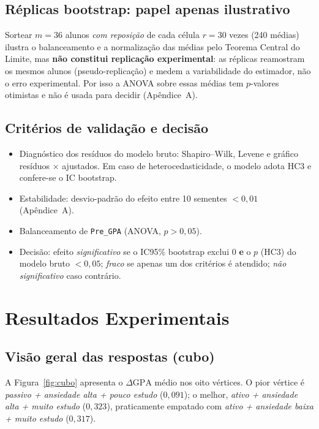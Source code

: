 \documentclass[12pt,a4paper]{article}
\newcommand{\dgpa}{\ensuremath{\Delta\mathrm{GPA}}}
\begin{document}
\subsection{R\'eplicas bootstrap: papel apenas ilustrativo}
Sortear $m=36$ alunos \emph{com reposi\c{c}\~ao} de cada c\'elula $r=30$ vezes (240 m\'edias) ilustra o balanceamento e a normaliza\c{c}\~ao das m\'edias pelo Teorema Central do Limite,
mas \textbf{n\~ao constitui replica\c{c}\~ao experimental}: as r\'eplicas reamostram os mesmos alunos (pseudo-replica\c{c}\~ao) e medem a variabilidade do estimador, n\~ao o erro experimental.
Por isso a ANOVA sobre essas m\'edias tem $p$-valores otimistas e n\~ao \'e usada para decidir (Ap\^endice~A).

\subsection{Crit\'erios de valida\c{c}\~ao e decis\~ao}
\begin{itemize}
\item Diagn\'ostico dos res\'iduos do modelo bruto: Shapiro--Wilk, Levene e gr\'afico res\'iduos $\times$ ajustados. Em caso de heterocedasticidade, o modelo adota HC3 e confere-se o IC bootstrap.
\item Estabilidade: desvio-padr\~ao do efeito entre 10 sementes $<0{,}01$ (Ap\^endice~A).
\item Balanceamento de \texttt{Pre\_GPA} (ANOVA, $p>0{,}05$).
\item Decis\~ao: efeito \emph{significativo} se o IC95\% bootstrap exclui 0 \textbf{e} o $p$ (HC3) do modelo bruto $<0{,}05$;
\emph{fraco} se apenas um dos crit\'erios \'e atendido; \emph{n\~ao significativo} caso contr\'ario.
\end{itemize}

\section{Resultados Experimentais}
\subsection{Vis\~ao geral das respostas (cubo)}
A Figura~\ref{fig:cubo} apresenta o \dgpa{} m\'edio nos oito v\'ertices. O pior v\'ertice \'e
\emph{passivo + ansiedade alta + pouco estudo} ($0{,}091$); o melhor, \emph{ativo + ansiedade alta + muito estudo} ($0{,}323$),
praticamente empatado com \emph{ativo + ansiedade baixa + muito estudo} ($0{,}317$).
\end{document}
